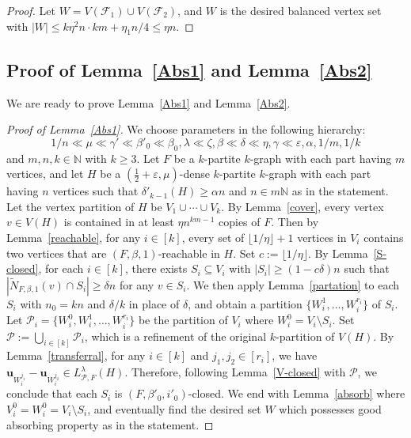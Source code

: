 \documentclass[11pt,a4paper]{article}
\theoremstyle{definition}
\begin{document}
\begin{proof}
 Let $W=V(\mathcal{F}_1)\cup V(\mathcal{F}_2)$, and $W$ is the desired balanced vertex set with $|W|\leq k\eta^2n\cdot km+\eta_1n/4\leq \eta n$.


    
\end{proof}


\subsection{Proof of Lemma~\ref{Abs1} and Lemma~\ref{Abs2}}
We are ready to prove Lemma~\ref{Abs1} and Lemma~\ref{Abs2}.

\begin{proof}[Proof of Lemma~\ref{Abs1}]
    We choose parameters in the following hierarchy:
    $$1/n \ll \mu \ll \gamma' \ll \beta'_0 \ll \beta_0, \lambda\ll \zeta, \beta \ll \delta \ll \eta, \gamma \ll \varepsilon ,\alpha ,1/m ,1/k$$
    and $m, n, k\in \mathbb{N}$ with $k\geq 3$. Let $F$ be a $k$-partite $k$-graph with each part having $m$ vertices, and let $H$ be a $(\frac{1}{2}+\varepsilon, \mu)$-dense $k$-partite $k$-graph with each part having $n$ vertices such that $\delta'_{k-1}(H)\geq \alpha n$ and $n\in m\mathbb{N}$ as in the statement. Let the vertex partition of $H$ be $V_1\cup \cdots \cup V_k$. By Lemma~\ref{cover}, every vertex $v\in V(H)$ is contained in at least $\eta n^{km-1}$ copies of $F$. Then by Lemma~\ref{reachable}, for any $i\in [k]$, every set of $\lfloor 1/\eta \rfloor+1$ vertices in $V_i$ contains two vertices that are $(F,\beta ,1)$-reachable in $H$. Set $c:=\lfloor 1/\eta \rfloor$. By Lemma~\ref{S-closed}, for each $i\in [k]$, there exists $S_i\subseteq V_i$ with $|S_i|\geq (1-c\delta )n$ such that $|\tilde{N}_{F, \beta , 1}(v)\cap S_i|\geq \delta n$ for any $v\in S_i$. We then apply Lemma~\ref{partation} to each $S_i$ with $n_0=kn$ and $\delta/k$ in place of $\delta$, and obtain a partition $\{W_i^1,\dots,W_{i}^{r_i}\}$ of $S_i$. Let $\mathcal{P}_i =\{W_i^0, W_i^1,\dots,W_{i}^{r_i}\}$ be the partition of $V_i$ where $W_i^0=V_i\setminus S_i$. Set $\mathcal{P}:=\bigcup _{i\in [k]}\mathcal{P}_i$, which is a refinement of the original $k$-partition of $V(H)$. By Lemma~\ref{transferral}, for any $i\in [k]$ and $j_1, j_2\in [r_i]$, we have $\mathbf{u}_{W_i^{j_1}} -\mathbf{u}_{W_i^{j_2}} \in  L^{\lambda}_{\mathcal{P},F}(H)$. Therefore, following Lemma~\ref{V-closed} with $\mathcal{P}$, we conclude that each $S_i$ is $(F, \beta'_0, i'_0)$-closed. We end with Lemma~\ref{absorb} where $V_i^0=W_i^0=V_i\setminus S_i$, and eventually find the desired set $W$ which possesses good absorbing property as in the statement.
    
\end{proof}
\end{document}
